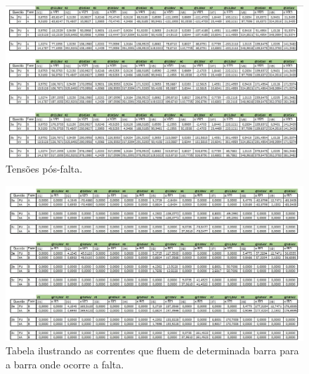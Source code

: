 \documentclass[a4paper, 12pt]{article}
\begin{document}
\begin{figure}[h]
\centering
  \includegraphics[scale=0.6]{img/tensoes.jpg}
\caption{Tensões pós-falta.}
\label{fig:posfalta}
\end{figure}

\begin{figure}[h]
\centering
  \includegraphics[scale=0.6]{img/correntes.jpg}
\caption{Tabela ilustrando as correntes que fluem de determinada barra para a barra onde ocorre a falta.}
\label{fig:correntes}
\end{figure}
\end{document}
